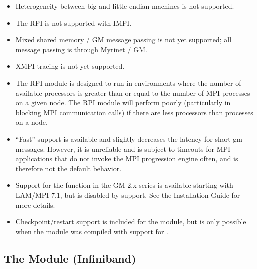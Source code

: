 \begin{itemize}
\item Heterogeneity between big and little endian machines is not
  supported.
  
\item The  RPI is not supported with IMPI.
  
\item Mixed shared memory / GM message passing is not yet supported;
  all message passing is through Myrinet / GM.
  
\item XMPI tracing is not yet supported.

  
\item The  RPI module is designed to run in environments where
  the number of available processors is greater than or equal to the
  number of MPI processes on a given node.  The  RPI module
  will perform poorly (particularly in blocking MPI communication
  calls) if there are less processors than processes on a node.



\item ``Fast'' support is available and slightly decreases the latency
  for short gm messages.  However, it is unreliable and is subject to
  timeouts for MPI applications that do not invoke the MPI progression
  engine often, and is therefore not the default behavior.

\item Support for the  function in the GM 2.x series
  is available starting with LAM/MPI 7.1, but is disabled by support.
  See the Installation Guide for more details.
  
\item Checkpoint/restart support is included for the  module,
  but is only possible when the  module was compiled with
  support for .


\end{itemize}


\subsection{The  Module (Infiniband)}
\label{sec:mpi-ssi-ib}

